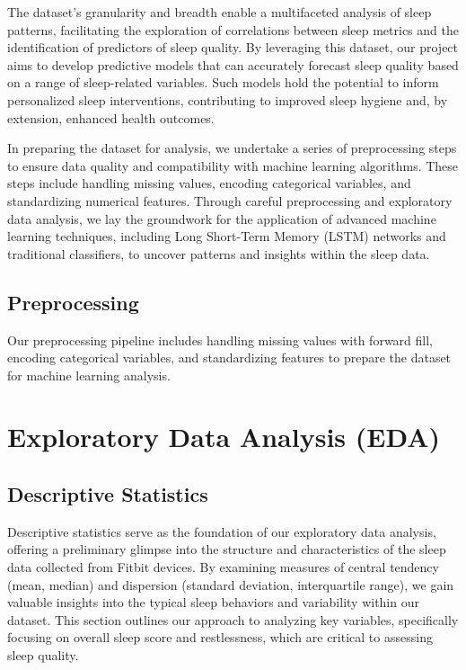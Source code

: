 \documentclass[10pt]{extarticle}
\begin{document}
The dataset's granularity and breadth enable a multifaceted analysis of sleep patterns, facilitating the exploration of correlations between sleep metrics and the identification of predictors of sleep quality. By leveraging this dataset, our project aims to develop predictive models that can accurately forecast sleep quality based on a range of sleep-related variables. Such models hold the potential to inform personalized sleep interventions, contributing to improved sleep hygiene and, by extension, enhanced health outcomes.

In preparing the dataset for analysis, we undertake a series of preprocessing steps to ensure data quality and compatibility with machine learning algorithms. These steps include handling missing values, encoding categorical variables, and standardizing numerical features. Through careful preprocessing and exploratory data analysis, we lay the groundwork for the application of advanced machine learning techniques, including Long Short-Term Memory (LSTM) networks and traditional classifiers, to uncover patterns and insights within the sleep data.

\subsection{Preprocessing}

Our preprocessing pipeline includes handling missing values with forward fill, encoding categorical variables, and standardizing features to prepare the dataset for machine learning analysis.

\section{Exploratory Data Analysis (EDA)}

\subsection{Descriptive Statistics}

Descriptive statistics serve as the foundation of our exploratory data analysis, offering a preliminary glimpse into the structure and characteristics of the sleep data collected from Fitbit devices. By examining measures of central tendency (mean, median) and dispersion (standard deviation, interquartile range), we gain valuable insights into the typical sleep behaviors and variability within our dataset. This section outlines our approach to analyzing key variables, specifically focusing on overall sleep score and restlessness, which are critical to assessing sleep quality.
\end{document}

